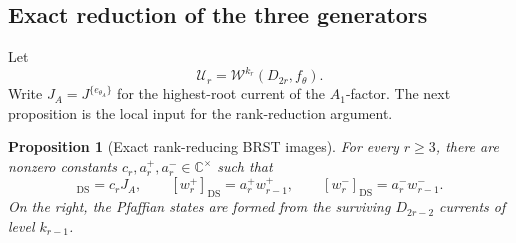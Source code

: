 \documentclass[11pt,reqno]{amsart}
\newtheorem{proposition}[theorem]{Proposition}
\theoremstyle{definition}
\theoremstyle{remark}
\begin{document}
\subsection{Exact reduction of the three generators}


Let
\begin{equation*}
  \mathcal U_r
  =
  \mathcal W^{k_r}(D_{2r},f_\theta).
\end{equation*}
Write $J_A=J^{\{e_{\theta_A}\}}$ for the highest-root current of the
$A_1$-factor.  The next proposition is the local input for the
rank-reduction argument.

\begin{proposition}[Exact rank-reducing BRST images]
\label{prop:collapsing-exact-images}
For every $r\ge3$, there are nonzero constants
$c_r,a_r^+,a_r^-\in\mathbb C^\times$ such that
\begin{equation}
  [v_r]_{\mathrm{DS}}=c_rJ_A,
  \qquad
  [w_r^+]_{\mathrm{DS}}=a_r^+w_{r-1}^+,
  \qquad
  [w_r^-]_{\mathrm{DS}}=a_r^-w_{r-1}^-.
  \label{eq:collapsing-exact-images}
\end{equation}
On the right, the Pfaffian states are formed from the surviving
$D_{2r-2}$ currents of level $k_{r-1}$.
\end{proposition}
\end{document}
